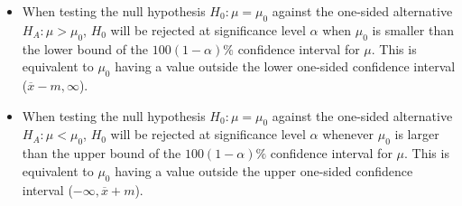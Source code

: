 \begin{termBox}{
  {
  	\begin{itemize}
	\item When testing the null hypothesis $H_0:\mu = \mu_0$ against the one-sided alternative $H_A: \mu > \mu_0$, $H_0$ will be rejected at significance level $\alpha$ when $\mu_0$ is smaller than the lower bound of the $100(1-\alpha)\%$ confidence interval for $\mu$. This is equivalent to $\mu_0$ having a value outside the lower one-sided confidence interval ($\overline{x} - m, \infty$).

	\item When testing the null hypothesis $H_0:\mu = \mu_0$ against the one-sided alternative $H_A: \mu < \mu_0$, $H_0$ will be rejected at significance level $\alpha$ whenever $\mu_0$ is larger than the upper bound of the $100(1-\alpha)\%$ confidence interval for $\mu$. This is equivalent to $\mu_0$ having a value outside the upper one-sided confidence interval ($-\infty, \overline{x} + m$).
	\end{itemize}
  }}
\end{termBox}
		
